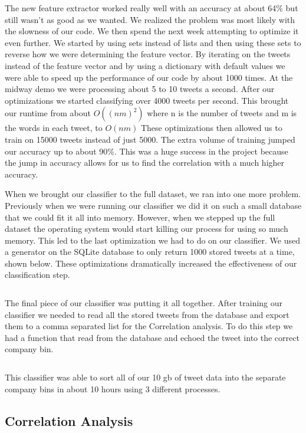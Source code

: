 \documentclass{acm_proc_article-sp}
\begin{document}
\inputminted{python}{examples/train.py}

The new feature extractor worked really well with an accuracy at about 64\% but
still wasn't as good as we wanted. We realized the problem was most likely with
the slowness of our code. We then spend the next week attempting to optimize it
even further. We started by using sets instead of lists and then using these
sets to reverse how we were determining the feature vector. By iterating on the
tweets instead of the feature vector and by using a dictionary with default
values we were able to speed up the performance of our code by about 1000
times. At the midway demo we were processing about 5 to 10 tweets a second.
After our optimizations we started classifying over 4000 tweets per second.
This brought our runtime from about $O((nm)^2)$ where n is the number of tweets
and m is the words in each tweet, to $O(nm)$ These optimizations then allowed
us to train on 15000 tweets instead of just 5000. The extra volume of training
jumped our accuracy up to about 90\%. This was a huge success in the project
because the jump in accuracy allows for us to find the correlation with a much
higher accuracy. 

When we brought our classifier to the full dataset, we ran into one more
problem.  Previously when we were running our classifier we did it on such a
small database that we could fit it all into memory. However, when we stepped
up the full dataset the operating system would start killing our process
for using so much memory. This led to the last optimization we had to do on our
classifier. We used a generator on the SQLite database to only return 1000
stored tweets at a time, shown below. These optimizations dramatically
increased the effectiveness of our classification step.

\inputminted{python}{examples/generator.py}

The final piece of our classifier was putting it all together. After training
our classifier we needed to read all the stored tweets from the database and
export them to a comma separated list for the Correlation analysis. To do this
step we had a function that read from the database and echoed the tweet into
the correct company bin.

\inputminted{python}{examples/converter.py}

This classifier was able to sort all of our 10 gb of tweet data into the
separate company bins in about 10 hours using 3 different processes. 

\subsection{Correlation Analysis}
\end{document}

